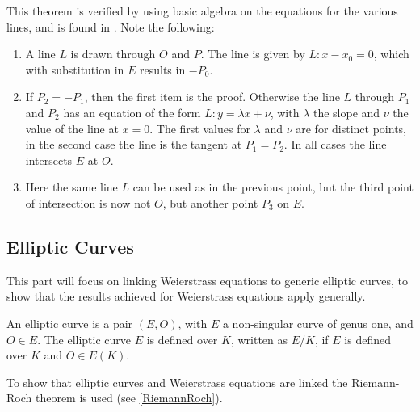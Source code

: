 \begin{prf}
	This theorem is verified by using basic algebra on the equations for the various lines, and is found in \cite[pages 52-54]{EllipticCurvesBook}. Note the following:
	\begin{enumerate}
		\item A line $L$ is drawn through $O$ and $P$. The line is given by $L:x-x_0=0$, which with substitution in $E$ results in $-P_0$.
		\item If $P_2=-P_1$, then the first item is the proof. Otherwise the line $L$ through $P_1$ and $P_2$ has an equation of the form $L:y=\lambda x+\nu$, with $\lambda$ the slope and $\nu$ the value of the line at $x=0$. The first values for $\lambda$ and $\nu$ are for distinct points, in the second case the line is the tangent at $P_1=P_2$. In all cases the line intersects $E$ at $O$.
		\item Here the same line $L$ can be used as in the previous point, but the third point of intersection is now not $O$, but another point $P_3$ on $E$.
	\end{enumerate}
\end{prf}

\subsection{Elliptic Curves}
This part will focus on linking Weierstrass equations to generic elliptic curves, to show that the results achieved for Weierstrass equations apply generally.
\begin{defn}
	An elliptic curve is a pair $(E,O)$, with $E$ a non-singular curve of genus one, and $O\in E$. The elliptic curve $E$ is defined over $K$, written as $E/K$, if $E$ is defined over $K$ and $O\in E(K)$.
\end{defn}

To show that elliptic curves and Weierstrass equations are linked the Riemann-Roch theorem is used (see \ref{RiemannRoch}).


